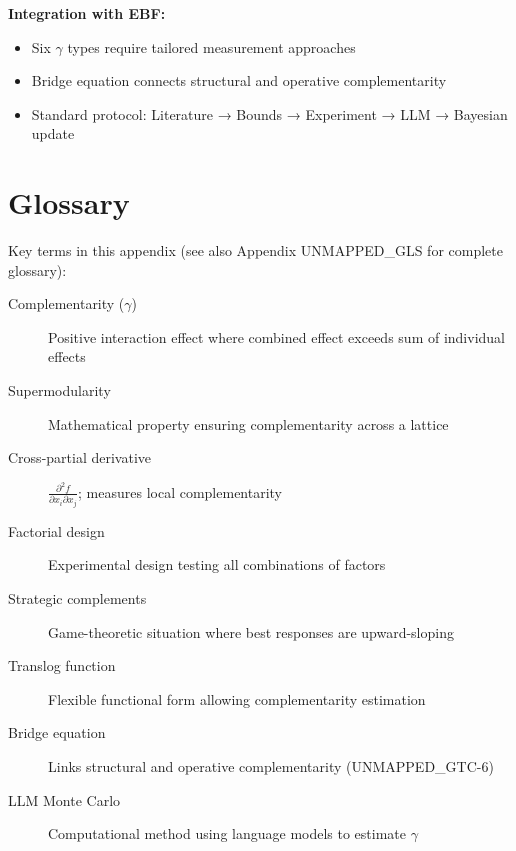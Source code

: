 \begin{tcolorbox}[colback=gray!5!white,colframe=gray!75!black,title=\textbf{Summary: Complementarity Measurement Methodology}]
\textbf{Integration with EBF:}
\begin{itemize}[noitemsep]
    \item Six $\gamma$ types require tailored measurement approaches
    \item Bridge equation connects structural and operative complementarity
    \item Standard protocol: Literature → Bounds → Experiment → LLM → Bayesian update
\end{itemize}

\end{tcolorbox}

\section{Glossary}
\label{sec:glossary}

Key terms in this appendix (see also Appendix UNMAPPED_GLS for complete glossary):

\begin{description}
    \item[Complementarity ($\gamma$)] Positive interaction effect where combined effect exceeds sum of individual effects
    \item[Supermodularity] Mathematical property ensuring complementarity across a lattice
    \item[Cross-partial derivative] $\frac{\partial^2 f}{\partial x_i \partial x_j}$; measures local complementarity
    \item[Factorial design] Experimental design testing all combinations of factors
    \item[Strategic complements] Game-theoretic situation where best responses are upward-sloping
    \item[Translog function] Flexible functional form allowing complementarity estimation
    \item[Bridge equation] Links structural and operative complementarity (UNMAPPED_GTC-6)
    \item[LLM Monte Carlo] Computational method using language models to estimate $\gamma$
\end{description}

